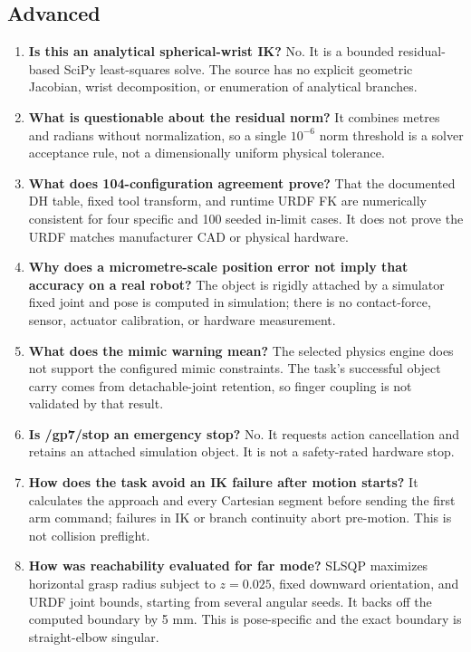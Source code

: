 \subsection{Advanced}
\begin{enumerate}
 \item \textbf{Is this an analytical spherical-wrist IK?} No. It is a
 bounded residual-based SciPy least-squares solve. The source has no explicit
 geometric Jacobian, wrist decomposition, or enumeration of analytical
 branches.
 \item \textbf{What is questionable about the residual norm?} It combines
 metres and radians without normalization, so a single $10^{-6}$ norm
 threshold is a solver acceptance rule, not a dimensionally uniform physical
 tolerance.
 \item \textbf{What does 104-configuration agreement prove?} That the
 documented DH table, fixed tool transform, and runtime URDF FK are
 numerically consistent for four specific and 100 seeded in-limit cases.
 It does not prove the URDF matches manufacturer CAD or physical hardware.
 \item \textbf{Why does a micrometre-scale position error not imply that
 accuracy on a real robot?} The object is rigidly attached by a simulator
 fixed joint and pose is computed in simulation; there is no contact-force,
 sensor, actuator calibration, or hardware measurement.
 \item \textbf{What does the mimic warning mean?} The selected physics
 engine does not support the configured mimic constraints. The task's
 successful object carry comes from detachable-joint retention, so finger
 coupling is not validated by that result.
 \item \textbf{Is /gp7/stop an emergency stop?} No. It requests action
 cancellation and retains an attached simulation object. It is not a
 safety-rated hardware stop.
 \item \textbf{How does the task avoid an IK failure after motion starts?}
 It calculates the approach and every Cartesian segment before sending the
 first arm command; failures in IK or branch continuity abort pre-motion.
 This is not collision preflight.
 \item \textbf{How was reachability evaluated for far mode?} SLSQP
 maximizes horizontal grasp radius subject to $z=0.025$, fixed downward
 orientation, and URDF joint bounds, starting from several angular seeds.
 It backs off the computed boundary by 5 mm. This is pose-specific and the
 exact boundary is straight-elbow singular.
\end{enumerate}

